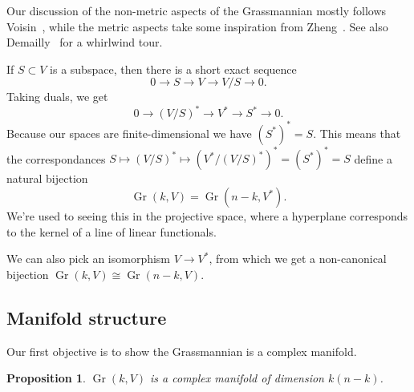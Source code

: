 \documentclass[10pt,a4paper]{article}
\newtheorem{prop}[theo]{Proposition}
\DeclareMathOperator{\Gr}{Gr}
\begin{document}
Our discussion of the non-metric aspects of the Grassmannian mostly follows Voisin~\cite{voisin2002theorie}, while the metric aspects take some inspiration from Zheng~\cite{zheng2000complex}. See also Demailly~\cite[Chapter~5.16]{demailly-complex} for a whirlwind tour.

If $S \subset V$ is a subspace, then there is a short exact sequence
$$
0 \to S \to V \to V/S \to 0.
$$
Taking duals, we get
$$
0 \to (V/S)^* \to V^* \to S^* \to 0.
$$
Because our spaces are finite-dimensional we have $(S^*)^* = S$. This means that the correspondances $S \mapsto (V/S)^* \mapsto (V^* / (V/S)^*)^* = (S^*)^* = S$ define a natural bijection
$$
\Gr(k, V) = \Gr(n-k, V^*).
$$
We're used to seeing this in the projective space, where a hyperplane corresponds to the kernel of a line of linear functionals.

We can also pick an isomorphism $V \to V^*$, from which we get a non-canonical bijection $\Gr(k, V) \cong \Gr(n-k, V)$.

\subsection{Manifold structure}

Our first objective is to show the Grassmannian is a complex manifold.

\begin{prop}
$\Gr(k, V)$ is a complex manifold of dimension $k(n-k)$.
\end{prop}
\end{document}
